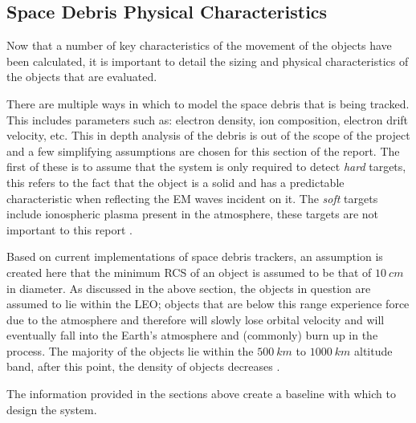 \documentclass[11pt]{witseiepaper}
\begin{document}
\begin{bibunit}[witseie]
\subsection{Space Debris Physical Characteristics} \label{sec:SpaceDebrisPhysicalCharacteristics}
Now that a number of key characteristics of the movement of the objects have been calculated, it is important to detail the sizing and physical characteristics of the objects that are evaluated.

There are multiple ways in which to model the space debris that is being tracked. This includes parameters such as: electron density, ion composition, electron drift velocity, etc. This in depth analysis of the debris is out of the scope of the project and a few simplifying assumptions are chosen for this section of the report.
The first of these is to assume that the system is only required to detect \textit{hard} targets, this refers to the fact that the object is a solid and has a predictable characteristic when reflecting the EM waves incident on it. The \textit{soft} targets include ionospheric plasma present in the atmosphere, these targets are not important to this report \cite{softTarget}.  

Based on current implementations of space debris trackers, an assumption is created here that the minimum RCS of an object is assumed to be that of $10~cm$ in diameter.
As discussed in the above section, the objects in question are assumed to lie within the LEO; objects that are below this range experience force due to the atmosphere and therefore will slowly lose orbital velocity and will eventually fall into the Earth's atmosphere and (commonly) burn up in the process.
The majority of the objects lie within the $500~km$ to $1000~km$ altitude band, after this point, the density of objects decreases \cite{ObjectInformation}.

The information provided in the sections above create a baseline with which to design the system.





\end{bibunit}
\end{document}
